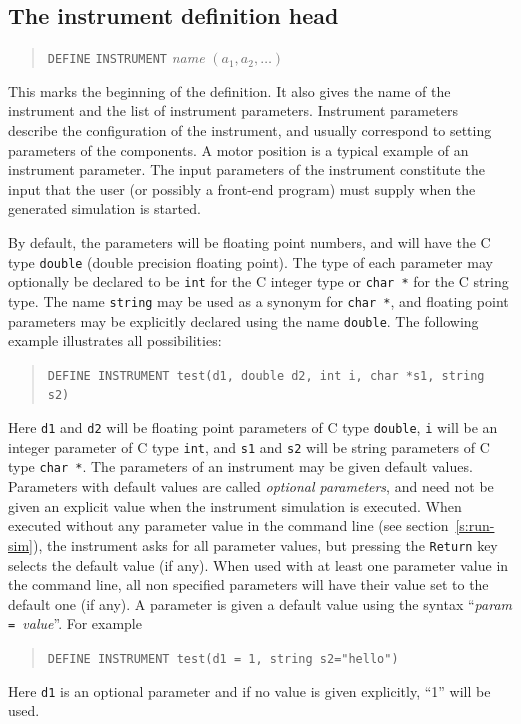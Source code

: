 \subsection{The instrument definition head}

\begin{quote}
  \texttt{DEFINE} \texttt{INSTRUMENT} \textit{name} $(a_1, a_2, \ldots)$
\end{quote} 
This marks the beginning of the definition. It also gives the name of
the instrument and the list of instrument parameters. Instrument
parameters describe the configuration of the instrument, and usually
correspond to setting parameters of the components. A motor position is
a typical example of an instrument parameter. The input parameters of
the instrument constitute the input that the user (or possibly a
front-end program) must supply when the
generated simulation is started.

By default, the parameters will be floating point numbers, and will have
the C type \verb+double+ (double precision floating point). The type of
each parameter may optionally be declared to be \verb+int+ for the C
integer type or \verb+char *+ for the C string type. The name
\verb+string+ may be used as a synonym for \verb+char *+, and floating
point parameters may be explicitly declared using the name
\verb+double+. The following example illustrates all possibilities:
\begin{quote}
  \texttt{DEFINE INSTRUMENT test(d1, double d2, int i, char *s1, string s2)}
\end{quote}
Here \verb+d1+ and \verb+d2+ will be floating point parameters of C type
\verb+double+, \verb+i+ will be an integer parameter of C type
\verb+int+, and \verb+s1+ and \verb+s2+ will be string parameters of C
type \verb+char *+.
The parameters of an instrument may be given default values. Parameters with default values are called \emph{optional
  parameters}, and need not be given an explicit value when the
instrument simulation is executed. When executed without any parameter value in the command line (see section~\ref{s:run-sim}), the instrument asks for all parameter values, but pressing the \verb+Return+ key selects the default value (if any). When used with at least one parameter value in the command line, all non specified parameters will have their value set to the default one (if any). A parameter is given a
default value using the syntax ``\textit{param}\texttt{ = }\textit{value}''.
For example
\begin{quote}
  \texttt{DEFINE INSTRUMENT test(d1 = 1, string s2="hello")}
\end{quote}
Here \verb+d1+ is an optional parameter and if no value is given
explicitly, ``1'' will be used.

